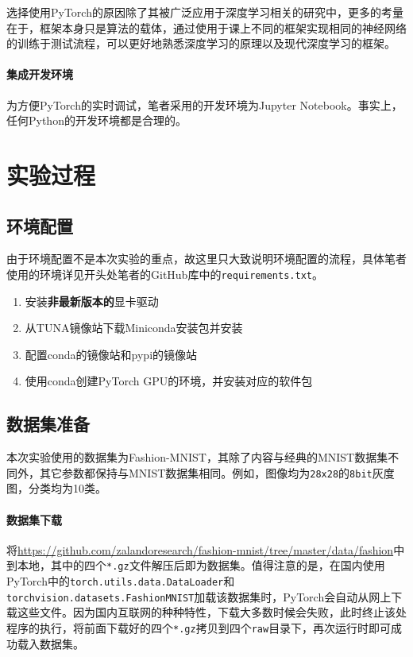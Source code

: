 \documentclass[cn,black,10pt,normal]{elegantnote}
\newcommand{\upcite}[1]{\textsuperscript{\textsuperscript{\cite{#1}}}}
\begin{document}
选择使用PyTorch的原因除了其被广泛应用于深度学习相关的研究中，更多的考量在于，框架本身只是算法的载体，通过使用于课上不同的框架实现相同的神经网络的训练于测试流程，可以更好地熟悉深度学习的原理以及现代深度学习的框架。

\paragraph{集成开发环境} 为方便PyTorch的实时调试，笔者采用的开发环境为Jupyter Notebook。事实上，任何Python的开发环境都是合理的。

\section{实验过程}

\subsection{环境配置} 由于环境配置不是本次实验的重点，故这里只大致说明环境配置的流程，具体笔者使用的环境详见开头处笔者的GitHub库中的\lstinline{requirements.txt}。
\begin{enumerate}
    \item 安装\textbf{非最新版本的}显卡驱动
    \item 从TUNA镜像站下载Miniconda安装包并安装
    \item 配置conda的镜像站和pypi的镜像站
    \item 使用conda创建PyTorch GPU的环境，并安装对应的软件包
\end{enumerate}

\subsection{数据集准备}
本次实验使用的数据集为Fashion-MNIST\upcite{xiao2017fashion}，其除了内容与经典的MNIST数据集不同外，其它参数都保持与MNIST数据集相同。例如，图像均为\lstinline{28x28}的\lstinline{8bit}灰度图，分类均为10类。
\paragraph{数据集下载} 将\url{https://github.com/zalandoresearch/fashion-mnist/tree/master/data/fashion}中到本地，其中的四个\lstinline{*.gz}文件解压后即为数据集。值得注意的是，在国内使用PyTorch中的\lstinline{torch.utils.data.DataLoader}和\lstinline{torchvision.datasets.FashionMNIST}加载该数据集时，PyTorch会自动从网上下载这些文件。因为国内互联网的种种特性，下载大多数时候会失败，此时终止该处程序的执行，将前面下载好的四个\lstinline{*.gz}拷贝到四个\lstinline{raw}目录下，再次运行时即可成功载入数据集。
\end{document}
